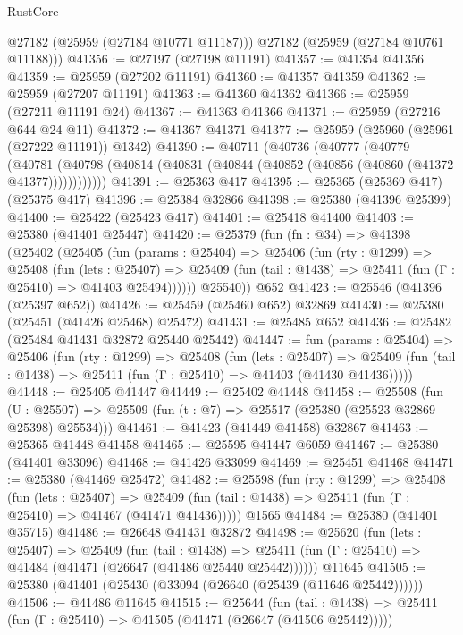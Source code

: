 \begin{lexlean}{RustCore}
\begin{coremodule}
        @27182
        (@25959 (@27184 @10771 @11187)))
      @27182
      (@25959 (@27184 @10761 @11188)))
@41356 := @27197 (@27198 @11191)
@41357 := @41354 @41356
@41359 := @25959 (@27202 @11191)
@41360 := @41357 @41359
@41362 := @25959 (@27207 @11191)
@41363 := @41360 @41362
@41366 := @25959 (@27211 @11191 @24)
@41367 := @41363 @41366
@41371 := @25959 (@27216 @644 @24 @11)
@41372 := @41367 @41371
@41377 := @25959 (@25960 (@25961 (@27222 @11191)) @1342)
@41390 := @40711
    (@40736
      (@40777
        (@40779
          (@40781 (@40798 (@40814 (@40831 (@40844 (@40852 (@40856 (@40860 (@41372 @41377))))))))))))
@41391 := @25363 @417
@41395 := @25365 (@25369 @417) (@25375 @417)
@41396 := @25384 @32866
@41398 := @25380 (@41396 @25399)
@41400 := @25422 (@25423 @417)
@41401 := @25418 @41400
@41403 := @25380 (@41401 @25447)
@41420 := @25379
    (fun (fn : @34) =>
    @41398
      (@25402
        (@25405
          (fun (params : @25404) =>
          @25406
            (fun (rty : @1299) =>
            @25408
              (fun (lets : @25407) =>
              @25409 (fun (tail : @1438) => @25411 (fun (Γ : @25410) => @41403 @25494))))))
        @25540))
    @652
@41423 := @25546 (@41396 (@25397 @652))
@41426 := @25459 (@25460 @652) @32869
@41430 := @25380 (@25451 (@41426 @25468) @25472)
@41431 := @25485 @652
@41436 := @25482 (@25484 @41431 @32872 @25440 @25442)
@41447 := fun (params : @25404) =>
  @25406
    (fun (rty : @1299) =>
    @25408
      (fun (lets : @25407) =>
      @25409 (fun (tail : @1438) => @25411 (fun (Γ : @25410) => @41403 (@41430 @41436)))))
@41448 := @25405 @41447
@41449 := @25402 @41448
@41458 := @25508
    (fun (U : @25507) => @25509 (fun (t : @7) => @25517 (@25380 (@25523 @32869 @25398) @25534)))
@41461 := @41423 (@41449 @41458) @32867
@41463 := @25365 @41448 @41458
@41465 := @25595 @41447 @6059
@41467 := @25380 (@41401 @33096)
@41468 := @41426 @33099
@41469 := @25451 @41468
@41471 := @25380 (@41469 @25472)
@41482 := @25598
    (fun (rty : @1299) =>
    @25408
      (fun (lets : @25407) =>
      @25409 (fun (tail : @1438) => @25411 (fun (Γ : @25410) => @41467 (@41471 @41436)))))
    @1565
@41484 := @25380 (@41401 @35715)
@41486 := @26648 @41431 @32872
@41498 := @25620
    (fun (lets : @25407) =>
    @25409
      (fun (tail : @1438) =>
      @25411 (fun (Γ : @25410) => @41484 (@41471 (@26647 (@41486 @25440 @25442))))))
    @11645
@41505 := @25380 (@41401 (@25430 (@33094 (@26640 (@25439 (@11646 @25442))))))
@41506 := @41486 @11645
@41515 := @25644
    (fun (tail : @1438) => @25411 (fun (Γ : @25410) => @41505 (@41471 (@26647 (@41506 @25442)))))

\end{coremodule}
\end{lexlean}
